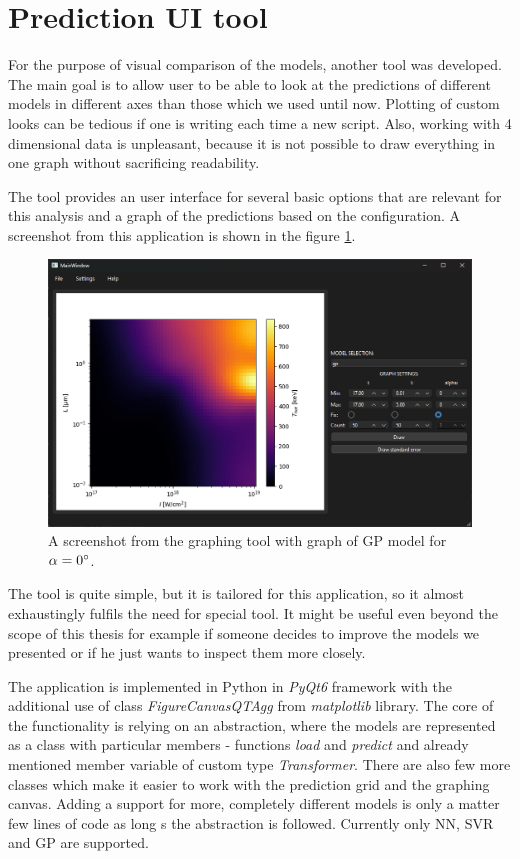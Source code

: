 \section{Prediction UI tool}
For the purpose of visual comparison of the models, another tool was developed. The main goal is to allow user to be able to look at the predictions of different models in different axes than those which we used until now. Plotting of custom looks can be tedious if one is writing each time a new script. Also, working with 4 dimensional data is unpleasant, because it is not possible to draw everything in one graph without sacrificing readability.

The tool provides an user interface for several basic options that are relevant for this analysis and a graph of the predictions based on the configuration. A screenshot from this application is shown in the figure \ref{fig:graph-tool}.

\begin{figure}[h]
	\centering
	\includegraphics[width=0.85 \textwidth]{figures/graph_tool}
	\caption{A screenshot from the graphing tool with graph of GP model for $\alpha = 0\degree$.}
	\label{fig:graph-tool}
\end{figure}

The tool is quite simple, but it is tailored for this application, so it almost exhaustingly fulfils the need for special tool. It might be useful even beyond the scope of this thesis for example if someone decides to improve the models we presented or if he just wants to inspect them more closely. 

The application is implemented in Python in \textit{PyQt6} framework with the additional use of class \textit{FigureCanvasQTAgg} from \textit{matplotlib} library. The core of the functionality is relying on an abstraction, where the models are represented as a class with particular members - functions \textit{load} and \textit{predict} and already mentioned member variable of custom type \textit{Transformer}. There are also few more classes which make it easier to work with the prediction grid and the graphing canvas. Adding a support for more, completely different models is only a matter few lines of code as long s the abstraction is followed. Currently only NN, SVR and GP are supported.

